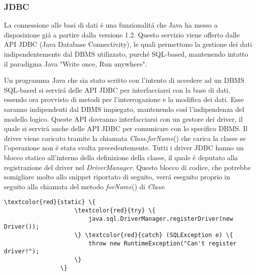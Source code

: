 \documentclass[12pt,a4paper,onecolumn,x11names]{article}
\begin{document}
\newpage

		\subsubsection{JDBC}
		\begin{flushleft}
				La connessione alle basi di dati \'{e} una funzionalit\'{a} che Java ha messo a disposizione gi\'{a} a partire dalla versione 1.2. Questo servizio viene offerto dalle API JDBC (Java Database Connectivity), le quali permettono la gestione dei dati indipendentemente dal DBMS utilizzato, purch\'{e} SQL-based, mantenendo intatto il paradigma Java "Write once, Run anywhere".\newline
				
				Un programma Java che sia stato scritto con l'intento di accedere ad un DBMS SQL-based si servir\'{a} delle API JDBC per interfacciarsi con la base di dati, essendo ora provvisto di metodi per l'interrogazione e la modifica dei dati. Esse saranno indipendenti dal DBMS impiegato, mantenendo cos\'{i} l'indipendenza del modello logico.\newline
				Queste API dovranno interfacciarsi con un gestore dei driver, il quale si servir\'{a} anche delle API JDBC per comunicare con lo specifico DBMS.
				Il driver viene caricato tramite la chiamata \textit{Class}.\textit{forName}() che carica la classe se l'operazione non \'{e} stata svolta precedentemente. Tutti i driver JDBC hanno un blocco statico all'interno della definizione della classe, il quale \'{e} deputato alla registrazione del driver nel \textit{DriverManager}. Questo blocco di codice, che potrebbe somigliare molto allo snippet riportato di seguito, verr\'{a} eseguito proprio in seguito alla chiamata del metodo \textit{forName}() di \textit{Class}:
		\end{flushleft}
				
				\begin{Verbatim}[label={Snippet da \cite{JDBCDriver}}]
				\textcolor{red}{static} \{ 
				    \textcolor{red}{try} \{
					    java.sql.DriverManager.registerDriver(new Driver());
				    \} \textcolor{red}{catch} (SQLException e) \{
				        throw new RuntimeException("Can't register driver!");
				    \}
				\}
				\end{Verbatim}
				
\end{document}
